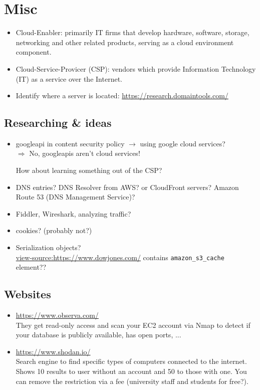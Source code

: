 \documentclass[12pt]{article}
\begin{document}
\newpage
\section*{Misc}
\begin{itemize}
    \item Cloud-Enabler: primarily IT firms that develop hardware, software, storage, networking and other related products, serving as a cloud environment component.
    \item Cloud-Service-Provicer (CSP): vendors which provide Information Technology (IT) as a service over the Internet.
    \item Identify where a server is located: \url{https://research.domaintools.com/}
\end{itemize}


\subsection*{Researching \& ideas}
\begin{itemize}
    \item googleapi in content security policy $\rightarrow$ using google cloud services? \\
    $\Rightarrow$ No, googleapis aren't cloud services!
    
    How about learning something out of the CSP?
    
    \item DNS entries? DNS Resolver from AWS? or CloudFront servers? Amazon Route 53 (DNS Management Service)?
    
    \item Fiddler, Wireshark, analyzing traffic?

    \item cookies? (probably not?)
    
    \item Serialization objects? \\
    \url{view-source:https://www.dowjones.com/} contains \verb|amazon_s3_cache| element??
\end{itemize}


\subsection*{Websites}
\begin{itemize}
    \item \url{https://www.observa.com/} \\ 
    They get read-only access and scan your EC2 account via Nmap to detect if your database is publicly available, has open ports, ... 
    \item \url{https://www.shodan.io/} \\
    Search engine to find specific types of computers connected to the internet. Shows 10 results to user without an account and 50 to those with one. You can remove the restriction via a fee (university staff and students for free?).
\end{itemize}
\end{document}
